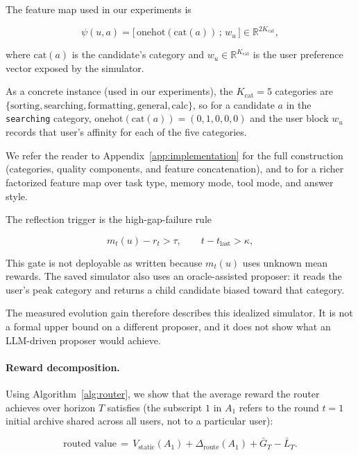 \documentclass{article} %
\begin{document}
The feature map used in our experiments is

\begin{equation}
\label{eq:method-feat}
\psi(u,a) = \big[\,\mathrm{onehot}(\mathrm{cat}(a))\,;\, w_u\,\big] \in \mathbb{R}^{2K_{\mathrm{cat}}},
\end{equation}

where $\mathrm{cat}(a)$ is the candidate's category and $w_u \in \mathbb{R}^{K_{\mathrm{cat}}}$ is the user preference vector exposed by the simulator.

As a concrete instance (used in our experiments), the $K_{\mathrm{cat}}=5$ categories are $\{\text{sorting}, \text{searching}, \text{formatting}, \text{general}, \text{calc}\}$, so for a candidate $a$ in the \texttt{searching} category, $\mathrm{onehot}(\mathrm{cat}(a))=(0,1,0,0,0)$ and the user block $w_u$ records that user's affinity for each of the five categories.

We refer the reader to Appendix~\ref{app:implementation} for the full construction (categories, quality components, and feature concatenation), and to \citet{jin2026personalizing} for a richer factorized feature map over task type, memory mode, tool mode, and answer style.

The reflection trigger is the high-gap-failure rule

\begin{equation}
\label{eq:method-trigger}
m_t(u) - r_t > \tau,\qquad t - t_{\mathrm{last}} > \kappa,
\end{equation}

This gate is not deployable as written because $m_t(u)$ uses unknown mean rewards. The saved simulator also uses an oracle-assisted proposer: it reads the user's peak category and returns a child candidate biased toward that category.

The measured evolution gain therefore describes this idealized simulator. It is not a formal upper bound on a different proposer, and it does not show what an LLM-driven proposer would achieve.

\paragraph{Reward decomposition.}
Using Algorithm~\ref{alg:router}, we show that the average reward the router achieves over horizon $T$ satisfies (the subscript $1$ in $A_1$ refers to the round $t=1$ initial archive shared across all users, not to a particular user):

\begin{equation}
\label{eq:method-thesis}
\text{routed value}
\,=\, V_{\mathrm{static}}(A_1) + \Delta_{\mathrm{route}}(A_1) + \bar G_T - \bar L_T.
\end{equation}
\end{document}
